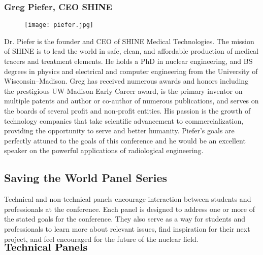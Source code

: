 \subsubsection{Greg Piefer, CEO SHINE}
\setlength\intextsep{0pt}
\begin{wrapfigure}{R}{0.35\textwidth}
	\begin{center}
		\vspace{-\baselineskip}
		\texttt{[image: piefer.jpg]}
	\end{center}
\end{wrapfigure}
Dr. Piefer is the founder and CEO of SHINE Medical Technologies. The mission of SHINE is to lead the world in safe, clean, and affordable production of medical tracers and treatment elements. He holds a PhD in nuclear engineering, and BS degrees in physics and electrical and computer engineering from the University of Wisconsin–Madison. Greg has received numerous awards and honors including the prestigious UW-Madison Early Career award, is the primary inventor on multiple patents and author or co-author of numerous publications, and serves on the boards of several profit and non-profit entities. His passion is the growth of technology companies that take scientific advancement to commercialization, providing the opportunity to serve and better humanity. Piefer's goals are perfectly attuned to the goals of this conference and he would be an excellent speaker on the powerful applications of radiological engineering.\\

\subsection{Saving the World Panel Series}
Technical and non-technical panels encourage interaction between students and professionals at the conference. Each panel is designed to address one or more of the stated goals for the conference. They also serve as a way for students and professionals to learn more about relevant issues, find inspiration for their next project, and feel encouraged for the future of the nuclear field.\\
 
$\Large\textbf{Technical Panels}$

